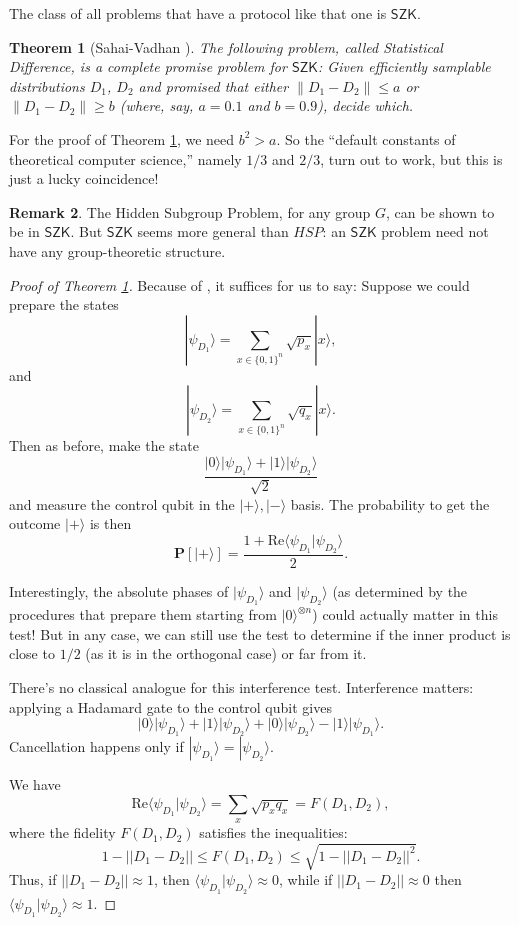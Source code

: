 \documentclass[12pt]{report}
\theoremstyle{plain}
\newtheorem{theorem}{Theorem}[section]
\theoremstyle{definition}
\newtheorem{remark}[theorem]{Remark}
\renewcommand{\Pr}{\mathbf{P}}
\renewcommand{\ket}[1]{|#1\rangle}
\newcommand{\braket}[2]{\langle#1|#2\rangle}
\begin{document}
The class of all problems that have a protocol like that one is $\mathsf{SZK}$.

\begin{theorem}[Sahai-Vadhan \cite{DBLP:journals/jacm/SahaiV03}]
\label{svthm}
The following problem, called Statistical Difference, is a complete promise problem for $\mathsf{SZK}$:
Given efficiently samplable distributions $D_1$, $D_2$ and promised that either $\|D_1 -D_2\| \leq a$ or $\|D_1 -D_2\| \geq b$ (where, say, $a=0.1$ and $b=0.9$), decide which.
\end{theorem}

For the proof of Theorem \ref{svthm}, we need $b^2 >a$.  So the ``default constants of theoretical computer science,'' namely $1/3$ and $2/3$, turn out to work, but this is just a lucky coincidence!

\begin{remark}
The Hidden Subgroup Problem, for any group $G$, can be shown to be in $\mathsf{SZK}$.  But $\mathsf{SZK}$ seems more general than $HSP$: an $\mathsf{SZK}$ problem need not have any group-theoretic structure.
\end{remark}

\begin{proof}[Proof of Theorem \ref{svthm}]
Because of \cite{DBLP:journals/jacm/SahaiV03}, it suffices for us to say:
Suppose we could prepare the states
\[
\ket{\psi_{D_1}} = \sum_{x \in \{0,1\}^n} \sqrt{p_x} \ket{x},
\]
and
\[
\ket{\psi_{D_2}} = \sum_{x \in \{0,1\}^n} \sqrt{q_x} \ket{x}.
\]
Then as before, make the state
\[
\frac{\ket0\ket{\psi_{D_1}}+\ket1\ket{\psi_{D_2}}}{\sqrt{2}}
\]
and measure the control qubit in the $\ket+,\ket-$ basis.  The probability to get the outcome $\ket+$ is then
\[
\Pr[\ket+] = \frac{1+\mathrm{Re}\braket{\psi_{D_1}}{\psi_{D_2}}}{2}.
\]

Interestingly, the absolute phases of $\ket{\psi_{D_1}}$ and $\ket{\psi_{D_2}}$ (as determined by the procedures that prepare them starting from $\ket{0}^{\otimes n}$) could actually matter in this test!  But in any case, we can still use the test to determine if the inner product is close to $1/2$ (as it is in the orthogonal case) or far from it.

There's no classical analogue for this interference test. Interference matters: applying a Hadamard gate to the control qubit gives
\[
\ket0\ket{\psi_{D_1}}+\ket1\ket{\psi_{D_2}}+\ket0\ket{\psi_{D_2}}-\ket1\ket{\psi_{D_1}}.
\]
Cancellation happens only if $\ket{\psi_{D_1}}=\ket{\psi_{D_2}}$.

We have
\[
\mathrm{Re}\braket{\psi_{D_1}}{\psi_{D_2}} = \sum_x \sqrt{p_x q_x} = F(D_1,D_2),
\]
where the fidelity $F(D_1,D_2)$ satisfies the inequalities:
\[
1-||D_1 - D_2|| \leq F(D_1,D_2) \leq \sqrt{1-||D_1-D_2||^2}.
\]
Thus, if $||D_1-D_2|| \approx 1$, then $\braket{\psi_{D_1}}{\psi_{D_2}} \approx 0$, while if $||D_1-D_2|| \approx 0$ then $\braket{\psi_{D_1}}{\psi_{D_2}} \approx 1$.
\end{proof}
\end{document}
